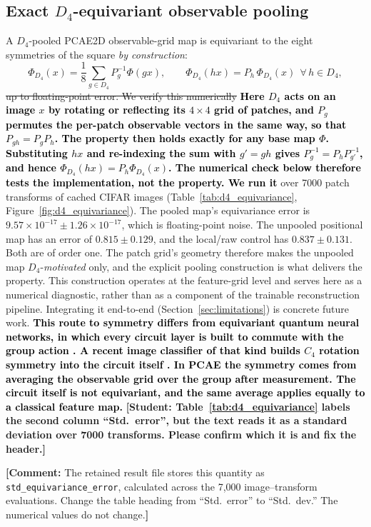 \documentclass[pdflatex,sn-basic]{sn-jnl}
\newcommand{\del}[1]{\sout{#1}}
\newcommand{\add}[1]{\textbf{\textcolor{black}{#1}}}
\newcommand{\yellowcomment}[1]{%
  \par\smallskip\noindent
  \begingroup\setlength{\fboxsep}{3pt}%
  \colorbox{yellow!35}{\parbox{\dimexpr\linewidth-2\fboxsep\relax}{\textbf{[Comment:} #1\textbf{]}}}%
  \endgroup\par\smallskip}
\begin{document}
\subsection{Exact \texorpdfstring{$D_4$}{D4}-equivariant observable pooling}
\label{sec:d4}
\label{sec:symmetry}

A $D_4$-pooled PCAE2D observable-grid map is equivariant to the eight symmetries
of the square \emph{by construction}:
\begin{equation}
  \Phi_{D_4}(x)=\frac{1}{8}\sum_{g\in D_4}P_g^{-1}\Phi(gx),
  \qquad
  \Phi_{D_4}(hx)=P_h\,\Phi_{D_4}(x)\ \ \forall\, h\in D_4,
\end{equation}
\del{up to floating-point error. We verify this numerically} \add{Here $D_4$
acts on an image $x$ by rotating or reflecting its $4\times4$ grid of patches,
and $P_g$ permutes the per-patch observable vectors in the same way, so that
$P_{gh}=P_gP_h$. The property then holds exactly for any base map $\Phi$.
Substituting $hx$ and re-indexing the sum with $g'=gh$ gives
$P_g^{-1}=P_hP_{g'}^{-1}$, and hence $\Phi_{D_4}(hx)=P_h\Phi_{D_4}(x)$. The
numerical check below therefore tests the implementation, not the property. We
run it} over 7000 patch
transforms of cached CIFAR images (Table~\ref{tab:d4_equivariance},
Figure~\ref{fig:d4_equivariance}). The pooled map's equivariance error is
$9.57\times10^{-17}\pm1.26\times10^{-17}$, which is floating-point noise. The
unpooled positional map has an error of $0.815\pm0.129$, and the local/raw
control has $0.837\pm0.131$. Both are of order one. The patch grid's geometry
therefore makes the unpooled map $D_4$-\emph{motivated} only, and the explicit
pooling construction is what delivers the property. This construction operates
at the feature-grid level and serves here as a numerical diagnostic, rather
than as a component of the trainable reconstruction pipeline. Integrating it
end-to-end (Section~\ref{sec:limitations}) is concrete future work.
\add{This route to symmetry differs from equivariant quantum neural networks,
in which every circuit layer is built to commute with the group action
\citep{Nguyen2024EQNN}. A recent image classifier of that kind builds $C_4$
rotation symmetry into the circuit itself \citep{SanSebastianSein2025}. In PCAE
the symmetry comes from averaging the observable grid over the group after
measurement. The circuit itself is not equivariant, and the same average applies
equally to a classical feature map.}
{\color{red}\textbf{[Student: Table~\ref{tab:d4_equivariance} labels the second
column ``Std.\ error'', but the text reads it as a standard deviation over 7000
transforms. Please confirm which it is and fix the header.]}}
\yellowcomment{The retained result file stores this quantity as \texttt{std\_equivariance\_error}, calculated across the 7,000 image--transform evaluations. Change the table heading from ``Std.\ error'' to ``Std.\ dev.'' The numerical values do not change.}
\end{document}
